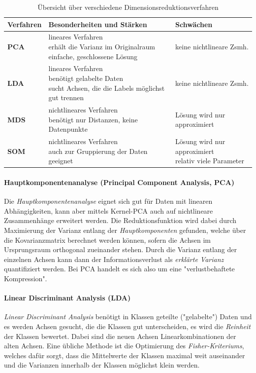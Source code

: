 				\begin{table}
					\centering
					\begin{tabular}{l|ll}
						\toprule
						\textbf{Verfahren} & \textbf{Besonderheiten und Stärken} & \textbf{Schwächen} \\ \midrule
						\textbf{PCA} & \multirowcell{3}[][l]{lineares Verfahren\\erhält die Varianz im Originalraum\\einfache, geschlossene Lösung} & keine nichtlineare Zsmh. \\ \midrule
						\textbf{LDA} & \multirowcell{3}[][l]{lineares Verfahren\\benötigt gelabelte Daten\\sucht Achsen, die die Labels möglichst gut trennen} & keine nichtlineare Zsmh. \\ \midrule
						\textbf{MDS} & \multirowcell{3}[][l]{nichtlineares Verfahren\\benötigt nur Distanzen, keine Datenpunkte} & Lösung wird nur approximiert \\ \midrule
						\textbf{SOM} & \multirowcell{2}[][l]{nichtlineares Verfahren\\auch zur Gruppierung der Daten geeignet} & \multirowcell{2}[][l]{Lösung wird nur approximiert\\relativ viele Parameter} \\
						\bottomrule
					\end{tabular}
					\caption{Übersicht über verschiedene Dimensionsreduktionsverfahren}
					\label{tab:dimRed}
				\end{table}

				\paragraph{Hauptkomponentenanalyse (Principal Component Analysis, PCA)}
					Die \emph{Hauptkomponentenanalyse} eignet sich gut für Daten mit linearen Abhängigkeiten, kann aber mittels Kernel-PCA auch auf nichtlineare Zusammenhänge erweitert werden. Die Reduktionsfunktion wird dabei durch Maximierung der Varianz entlang der \emph{Hauptkomponenten} gefunden, welche über die Kovarianzmatrix berechnet werden können, sofern die Achsen im Ursprungsraum orthogonal zueinander stehen. Durch die Varianz entlang der einzelnen Achsen kann dann der Informationsverlust als \emph{erklärte Varianz} quantifiziert werden. Bei PCA handelt es sich also um eine "verlustbehaftete Kompression".

				\paragraph{Linear Discriminant Analysis (LDA)}
					\emph{Linear Discriminant Analysis} benötigt in Klassen geteilte ("gelabelte") Daten und es werden Achsen gesucht, die die Klassen gut unterscheiden, \dh es wird die \emph{Reinheit} der Klassen bewertet. Dabei sind die neuen Achsen Linearkombinationen der alten Achsen. Eine übliche Methode ist die Optimierung des \emph{Fisher-Kriteriums}, welches dafür sorgt, dass die Mittelwerte der Klassen maximal weit auseinander und die Varianzen innerhalb der Klassen möglichst klein werden.

